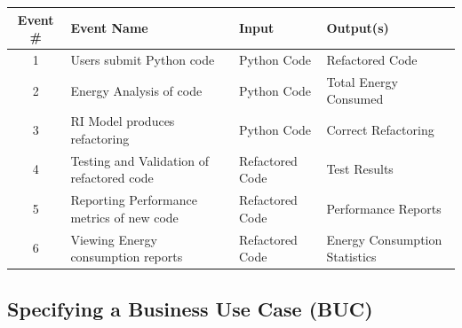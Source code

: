 \documentclass[12pt]{article}
\begin{document}
\setlength\extrarowheight{5mm}
\begin{tabularx}{\textwidth}{|c|X|l|p{1.5in}|}
  \toprule \textbf{Event \#} & \textbf{Event Name} & \textbf{Input} & \textbf{Output(s)} \\
  \midrule
  1 & Users submit Python code & Python Code & Refactored Code \\
  2 & Energy Analysis of code & Python Code & Total Energy Consumed \\
  3 & RI Model produces refactoring & Python Code & Correct Refactoring \\
  4 & Testing and Validation of refactored code & Refactored Code & Test Results \\
  5 & Reporting Performance metrics of new code & Refactored Code & Performance Reports \\
  6 & Viewing Energy consumption reports & Refactored Code & Energy Consumption Statistics \\
  \bottomrule
\end{tabularx}

\subsection{Specifying a Business Use Case (BUC)}
\end{document}
